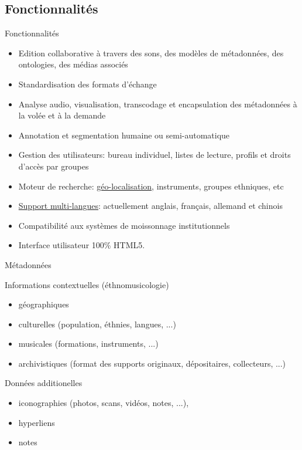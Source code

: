 \documentclass[final, hyperref, table]{beamer}
\begin{document}
\subsection{Fonctionnalités}
\begin{frame}[label=telemeta_features]{Fonctionnalités}
    \begin{itemize}
      \item \alert{Edition collaborative} à travers des sons, des modèles de métadonnées, des ontologies, des médias associés
      \item \alert{Standardisation} des formats d'échange
      \item \alert{Analyse} audio, \alert{visualisation}, \alert{transcodage} et \alert{encapsulation des métadonnées} à la volée et à la demande
      \item \alert{Annotation et segmentation} humaine ou semi-automatique
      \item \alert{Gestion des utilisateurs}: bureau individuel, listes de lecture, profils et droits d'accès par groupes
      \item \alert{Moteur de recherche}: \hyperlink{geonavigator}{géo-localisation}, instruments, groupes ethniques, etc
      \item \hyperlink{telemeta_languages}{\alert{Support multi-langues}}: actuellement anglais, français, allemand et chinois
      \item \alert{Compatibilité} aux systèmes de moissonnage institutionnels 
      \item Interface utilisateur \alert{100\% HTML5}.
      \end{itemize}
\end{frame}


\begin{frame}[label=telemeta_metadata]{Métadonnées}
\begin{block}{Informations contextuelles (éthnomusicologie)}
  \begin{itemize}
  \item géographiques
  \item culturelles (population, éthnies, langues, ...)
  \item musicales (formations, instruments, ...)
  \item archivistiques (format des supports originaux, dépositaires, collecteurs, ...)
  \end{itemize}
\end{block}

\begin{block}{Données additionelles}
  \begin{itemize}
  \item iconographies (photos, scans, vidéos, notes, ...),
  \item hyperliens
  \item notes
  \end{itemize}
\end{block}
\hyperlink{metadata_example}{    }
\end{frame}
\end{document}
